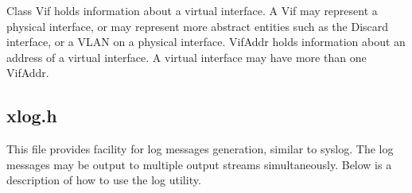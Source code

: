 \documentclass[11pt]{article}
\begin{document}
Class Vif holds information about a virtual interface.  A Vif may
represent a physical interface, or may represent more abstract
entities such as the Discard interface, or a VLAN on a physical
interface.
VifAddr holds information about an address of a virtual interface.
A virtual interface may have more than one VifAddr.

\subsection{xlog.h}

This file provides facility for log messages generation, similar to
syslog. The log messages may be output to multiple output streams
simultaneously. Below is a description of how to use the log utility.
\end{document}
